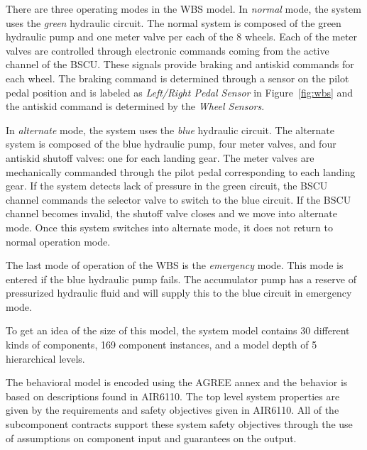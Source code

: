 There are three operating modes in the WBS model. In \textit{normal} mode, the system uses the \textit{green} hydraulic circuit. The normal system is composed of the green hydraulic pump and one meter valve per each of the 8 wheels. Each of the meter valves are controlled through electronic commands coming from the active channel of the BSCU. These signals provide braking and antiskid commands for each wheel. The braking command is determined through a sensor on the pilot pedal position and is labeled as \textit{Left/Right Pedal Sensor} in Figure~\ref{fig:wbs} and the antiskid command is determined by the \textit{Wheel Sensors}. 

In \textit{alternate} mode, the system uses the \textit{blue} hydraulic circuit. The alternate system is composed of the blue hydraulic pump, four meter valves, and four antiskid shutoff valves: one for each landing gear. The meter valves are mechanically commanded through the pilot pedal corresponding to each landing gear. If the system detects lack of pressure in the green circuit, the BSCU channel commands the selector valve to switch to the blue circuit. %
If the BSCU channel becomes invalid, the shutoff valve closes and we move into alternate mode. Once this system switches into alternate mode, it does not return to normal operation mode.

The last mode of operation of the WBS is the \textit{emergency} mode. This mode is entered if the blue hydraulic pump fails. The accumulator pump has a reserve of pressurized hydraulic fluid and will supply this to the blue circuit in emergency mode.

To get an idea of the size of this model, the system model contains 30 different kinds of components, 169 component instances, and a model depth of 5 hierarchical levels. 

The behavioral model is encoded using the AGREE annex and the behavior is based on descriptions found in AIR6110. The top level system properties are given by the requirements and safety objectives given in AIR6110. All of the subcomponent contracts support these system safety objectives through the use of assumptions on component input and guarantees on the output.

